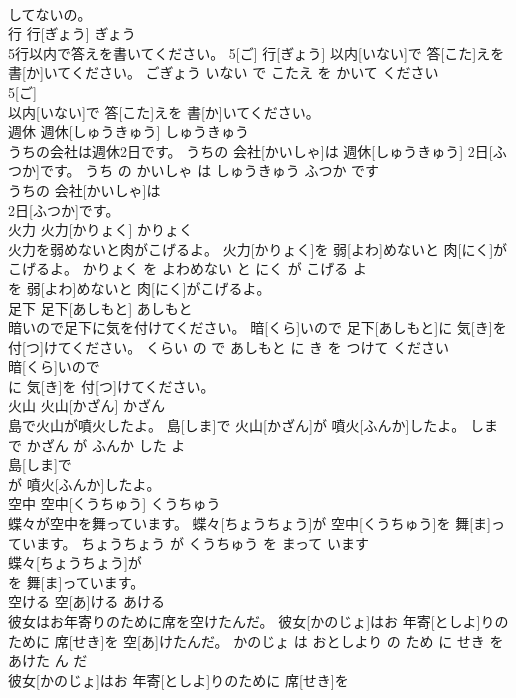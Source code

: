 \documentclass[8pt]{extreport}
\begin{document}
\begin{CJK}{UTF8}{min}
\\	してないの。			
\\	行	行[ぎょう]	ぎょう	
\\	5行以内で答えを書いてください。	5[ご] 行[ぎょう] 以内[いない]で 答[こた]えを 書[か]いてください。	ごぎょう いない で こたえ を かいて ください	
\\	5[ご]
\\	以内[いない]で 答[こた]えを 書[か]いてください。			
\\	週休	週休[しゅうきゅう]	しゅうきゅう	
\\	うちの会社は週休2日です。	うちの 会社[かいしゃ]は 週休[しゅうきゅう] 2日[ふつか]です。	うち の かいしゃ は しゅうきゅう ふつか です	
\\	うちの 会社[かいしゃ]は
\\	2日[ふつか]です。			
\\	火力	火力[かりょく]	かりょく	
\\	火力を弱めないと肉がこげるよ。	火力[かりょく]を 弱[よわ]めないと 肉[にく]がこげるよ。	かりょく を よわめない と にく が こげる よ	
\\	を 弱[よわ]めないと 肉[にく]がこげるよ。			
\\	足下	足下[あしもと]	あしもと	
\\	暗いので足下に気を付けてください。	暗[くら]いので 足下[あしもと]に 気[き]を 付[つ]けてください。	くらい の で あしもと に き を つけて ください	
\\	暗[くら]いので
\\	に 気[き]を 付[つ]けてください。			
\\	火山	火山[かざん]	かざん	
\\	島で火山が噴火したよ。	島[しま]で 火山[かざん]が 噴火[ふんか]したよ。	しま で かざん が ふんか した よ	
\\	島[しま]で
\\	が 噴火[ふんか]したよ。			
\\	空中	空中[くうちゅう]	くうちゅう	
\\	蝶々が空中を舞っています。	蝶々[ちょうちょう]が 空中[くうちゅう]を 舞[ま]っています。	ちょうちょう が くうちゅう を まって います	
\\	蝶々[ちょうちょう]が
\\	を 舞[ま]っています。			
\\	空ける	空[あ]ける	あける	
\\	彼女はお年寄りのために席を空けたんだ。	彼女[かのじょ]はお 年寄[としよ]りのために 席[せき]を 空[あ]けたんだ。	かのじょ は おとしより の ため に せき を あけた ん だ	
\\	彼女[かのじょ]はお 年寄[としよ]りのために 席[せき]を

\end{CJK}
\end{document}
